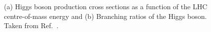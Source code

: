\captionsetup[subfloat]{captionskip=10pt} %
\begin{figure}
  \begin{center}
  \end{center}
  \caption{(a) Higgs boson production cross sections as a function of the LHC centre-of-mass energy and (b) Branching ratios of the Higgs boson. Taken from Ref.~\cite{deFlorian:2016spz}.}
\end{figure}
\captionsetup[subfloat]{captionskip=5pt} %

